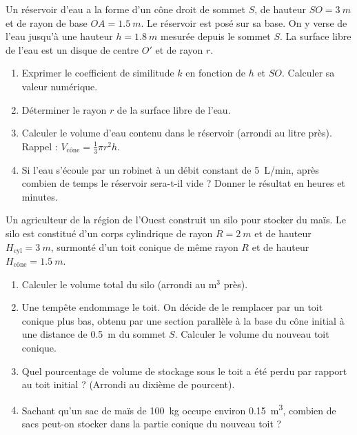 \documentclass[11pt]{article}
\begin{document}
\begin{exercice}
Un réservoir d'eau a la forme d'un cône droit de sommet $S$, de hauteur $SO = \SI{3}{m}$ et de rayon de base $OA = \SI{1,5}{m}$. Le réservoir est posé sur sa base. On y verse de l'eau jusqu'à une hauteur $h = \SI{1,8}{m}$ mesurée depuis le sommet $S$. La surface libre de l'eau est un disque de centre $O'$ et de rayon $r$.
\begin{enumerate}
    \item Exprimer le coefficient de similitude $k$ en fonction de $h$ et $SO$. Calculer sa valeur numérique.
    \item Déterminer le rayon $r$ de la surface libre de l'eau.
    \item Calculer le volume d'eau contenu dans le réservoir (arrondi au litre près). Rappel : $V_{\text{cône}} = \frac{1}{3}\pi r^2 h$.
    \item Si l'eau s'écoule par un robinet à un débit constant de \SI{5}{L/min}, après combien de temps le réservoir sera-t-il vide ? Donner le résultat en heures et minutes.
\end{enumerate}
\end{exercice}

\begin{exercice}
Un agriculteur de la région de l'Ouest construit un silo pour stocker du maïs. Le silo est constitué d'un corps cylindrique de rayon $R = \SI{2}{m}$ et de hauteur $H_{\text{cyl}} = \SI{3}{m}$, surmonté d'un toit conique de même rayon $R$ et de hauteur $H_{\text{cône}} = \SI{1,5}{m}$.
\begin{enumerate}
    \item Calculer le volume total du silo (arrondi au $\text{m}^3$ près).
    \item Une tempête endommage le toit. On décide de le remplacer par un toit conique plus bas, obtenu par une section parallèle à la base du cône initial à une distance de \SI{0,5}{m} du sommet $S$. Calculer le volume du nouveau toit conique.
    \item Quel pourcentage de volume de stockage sous le toit a été perdu par rapport au toit initial ? (Arrondi au dixième de pourcent).
    \item Sachant qu'un sac de maïs de \SI{100}{kg} occupe environ \SI{0,15}{m^3}, combien de sacs peut-on stocker dans la partie conique du nouveau toit ?
\end{enumerate}
\end{exercice}
\end{document}
